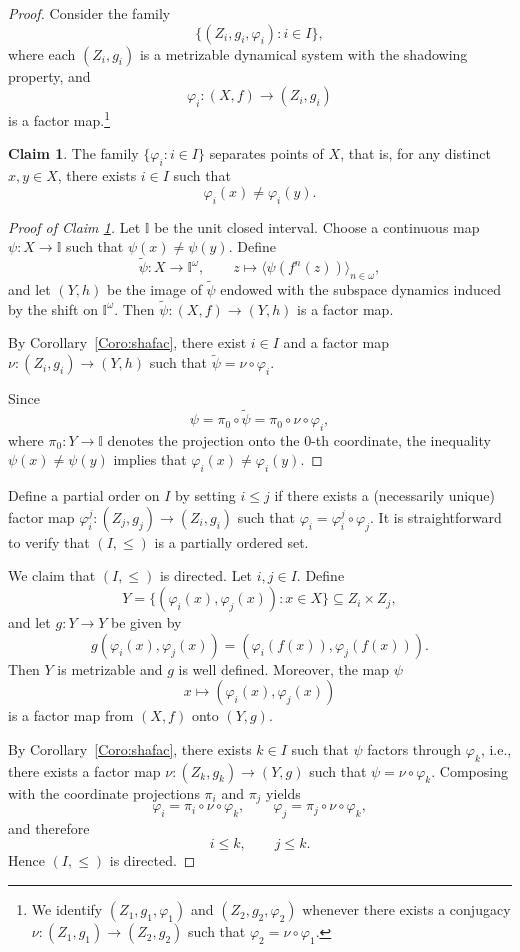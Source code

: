 \documentclass[12pt]{amsart}
\theoremstyle{definition}
\numberwithin{equation}{section}
\newtheorem{claim}{Claim}
\theoremstyle{remark}
\def\I{{\mathbb{I}}}
\begin{document}
\begin{proof}
Consider the family
\[
\{(Z_i,g_i,\varphi_i):i\in I\},
\]
where each $(Z_i,g_i)$ is a metrizable dynamical system with the shadowing property, and
\[
\varphi_i:(X,f)\to (Z_i,g_i)
\]
is a factor map.\footnote{
We identify $(Z_1,g_1,\varphi_1)$ and $(Z_2,g_2,\varphi_2)$ whenever there exists a conjugacy
$
\nu:(Z_1,g_1)\to (Z_2,g_2)
$
such that
$
\varphi_2=\nu\circ \varphi_1.
$
}

\begin{claim}\label{c0}
The family $\{\varphi_i:i\in I\}$ separates points of $X$, that is, for any distinct $x,y\in X$, there exists $i\in I$ such that
\[
\varphi_i(x)\neq \varphi_i(y).
\]
\end{claim}

\begin{proof}[Proof of Claim \ref{c0}]
Let $\I$ be the unit closed interval.
Choose a continuous map
$
\psi:X\to \mathbb I
$
such that $\psi(x)\neq \psi(y)$. Define
\[
\widetilde{\psi}:X\to \mathbb I^\omega,
\qquad
z\mapsto \langle \psi(f^n(z))\rangle_{n\in\omega},
\]
and let $(Y,h)$ be the image of $\widetilde{\psi}$ endowed with the subspace dynamics induced by the shift on $\mathbb I^\omega$. Then $\widetilde{\psi}:(X,f)\to (Y,h)$ is a factor map.

By Corollary~\ref{Coro:shafac}, there exist $i\in I$ and a factor map
$
\nu:(Z_i,g_i)\to (Y,h)
$
such that
$
\widetilde{\psi}
=
\nu\circ \varphi_i.$

Since
\[
\psi
=
\pi_0\circ \widetilde{\psi}
=
\pi_0\circ \nu\circ \varphi_i,
\]
where $\pi_0:Y\to \mathbb I$ denotes the projection onto the $0$-th coordinate, the inequality $\psi(x)\neq \psi(y)$ implies that
$
\varphi_i(x)\neq \varphi_i(y).
$
\end{proof}
Define a partial order on $I$ by setting $i\le j$ if there exists a (necessarily unique) factor map
$
\varphi_i^j:(Z_j,g_j)\to (Z_i,g_i)
$
such that
$
\varphi_i=\varphi_i^j\circ \varphi_j.
$
It is straightforward to verify that $(I,\le)$ is a partially ordered set.

We claim that $(I,\le)$ is directed. 
Let $i,j\in I$. Define
\[
Y=\{(\varphi_i(x),\varphi_j(x)):x\in X\}\subseteq Z_i\times Z_j,
\]
and let
$
g:Y\to Y
$
be given by
\[
g(\varphi_i(x),\varphi_j(x))
=
(\varphi_i(f(x)),\varphi_j(f(x))).
\]
Then $Y$ is metrizable and $g$ is well defined. Moreover, the map $\psi$
\[
x\mapsto (\varphi_i(x),\varphi_j(x))
\]
is a factor map from $(X,f)$ onto $(Y,g)$.

By Corollary~\ref{Coro:shafac}, there exists $k\in I$ such that $\psi$ factors through $\varphi_k$, i.e., there exists a factor map
$
\nu:(Z_k,g_k)\to (Y,g)
$
such that
$
\psi=\nu\circ \varphi_k.
$
Composing with the coordinate projections $\pi_i$ and $\pi_j$ yields
\[
\varphi_i=\pi_i\circ \nu\circ \varphi_k,
\qquad
\varphi_j=\pi_j\circ \nu\circ \varphi_k,
\]
and therefore
\[
i\le k,
\qquad
j\le k.
\]
Hence $(I,\le)$ is directed.



\end{proof}
\end{document}
